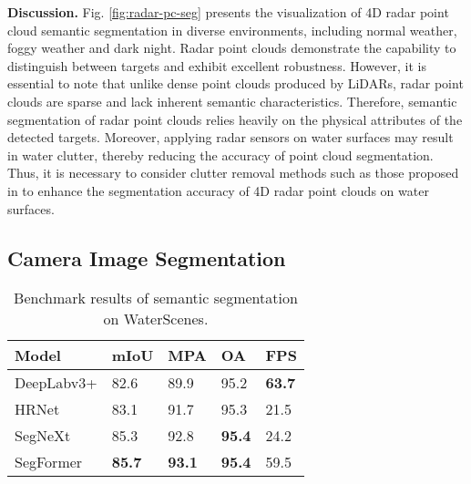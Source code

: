 \documentclass[lettersize,journal]{IEEEtran}
\begin{document}
\textbf{Discussion.} Fig. \ref{fig:radar-pc-seg} presents the visualization of 4D radar point cloud semantic segmentation in diverse environments, including normal weather, foggy weather and dark night. Radar point clouds demonstrate the capability to distinguish between targets and exhibit excellent robustness.
However, it is essential to note that unlike dense point clouds produced by LiDARs, radar point clouds are sparse and lack inherent semantic characteristics. Therefore, semantic segmentation of radar point clouds relies heavily on the physical attributes of the detected targets. 
Moreover, applying radar sensors on water surfaces may result in water clutter, thereby reducing the accuracy of point cloud segmentation. Thus, it is necessary to consider clutter removal methods such as those proposed in \cite{cheng2021new, cheng2021person} to enhance the segmentation accuracy of 4D radar point clouds on water surfaces.

\subsection{Camera Image Segmentation}

\begin{table}[htbp]
\caption{Benchmark results of semantic segmentation on WaterScenes.}
\center
\footnotesize
\begin{tabular*}{0.85\linewidth}{
p{2.2cm}<{}
p{0.8cm}<{\centering}
p{0.8cm}<{\centering}
p{0.8cm}<{\centering}
p{0.8cm}<{\centering}
}
\toprule
\bf{Model} & \bf{mIoU} & \bf{MPA} & \bf{OA}  & \bf{FPS} \\\midrule
DeepLabv3+ \cite{chen2018encoder} & 82.6 & 89.9 & 95.2 & \textbf{63.7} \\\midrule
HRNet \cite{wang2020deep} & 83.1 & 91.7 & 95.3 & 21.5\\\midrule
SegNeXt \cite{guo2022segnext} & 85.3 & 92.8 & \textbf{95.4} & 24.2 \\ \midrule
SegFormer \cite{xie2021segformer} & \textbf{85.7} & \textbf{93.1} & \textbf{95.4} & 59.5 \\
\bottomrule
\end{tabular*}
\vspace{1mm}
\label{tab:semantic_segmentation}
\end{table}
\end{document}
